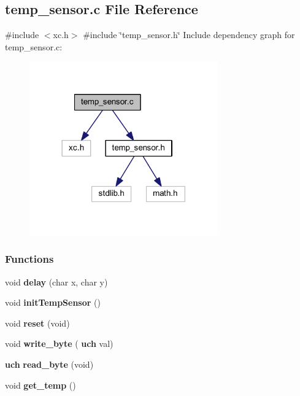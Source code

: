 \subsection{temp\+\_\+sensor.\+c File Reference}
\label{a00047}
{\ttfamily \#include $<$xc.\+h$>$}\newline
{\ttfamily \#include \char`\"{}temp\+\_\+sensor.\+h\char`\"{}}\newline
Include dependency graph for temp\+\_\+sensor.\+c\+:
\nopagebreak
\begin{figure}[H]
\begin{center}
\leavevmode
\includegraphics[width=230pt]{a00048}
\end{center}
\end{figure}
\subsubsection*{Functions}
\begin{DoxyCompactItemize}
\item 
void \textbf{ delay} (char x, char y)
\item 
void \textbf{ init\+Temp\+Sensor} ()
\item 
void \textbf{ reset} (void)
\item 
void \textbf{ write\+\_\+byte} (\textbf{ uch} val)
\item 
\textbf{ uch} \textbf{ read\+\_\+byte} (void)
\item 
void \textbf{ get\+\_\+temp} ()
\end{DoxyCompactItemize}
